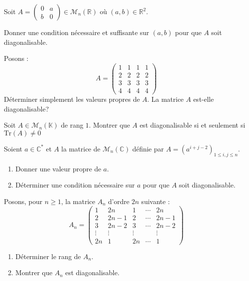 \documentclass[a4paper,10pt]{report}
\begin{document}
\begin{Exa} Soit $A= \begin{pmatrix}
0 & a \\
b & 0
\end{pmatrix} \in \mathcal{M}_n(\mathbb{R})$ où $(a,b) \in \mathbb{R}^2$. 

Donner une condition nécessaire et suffisante sur $(a,b)$ pour que $A$ soit diagonalisable.
\end{Exa}


\begin{Exa} Posons :
    \[
    A =
    \begin{pmatrix}
      1 & 1 & 1 & 1 \\
      2 & 2 & 2 & 2 \\
      3 & 3 & 3 & 3 \\
      4 & 4 & 4 & 4
    \end{pmatrix}
    \]
Déterminer simplement les valeurs propres de $A$. La matrice $A$ est-elle diagonalisable?
\end{Exa}



\begin{Exa}\label{Rang} Soit $A \in \mathcal{M}_{n}(\mathbb{K})$ de rang $1$. Montrer que $A$ est diagonalisable si et seulement si $\textrm{Tr}(A) \neq 0$ \end{Exa}


\begin{Exa} Soient $a \in \mathbb{C}^*$ et $A$ la matrice de $\mathcal{M}_n(\mathbb{C})$ définie par $A=( a^{i+j-2})_{1 \leq i,j \leq n}$.

\begin{enumerate}
\item Donner une valeur propre de $a$.
\item Déterminer une condition nécessaire sur $a$ pour que $A$ soit diagonalisable.
\end{enumerate}
\end{Exa}



\begin{Exa}[\ding{80}] Posons, pour $n \geq 1$, la matrice $A_n$ d'ordre $2n$ suivante :
$$ A_n = \begin{pmatrix}
1 & 2n & 1 & \cdots & 2n \\
2 & 2n-1 & 2 & \cdots & 2n-1 \\
3 & 2n-2 & 3 & \cdots & 2n-2 \\
\vdots & \vdots & \vdots &  & \vdots \\
2n & 1 & 2n & \cdots & 1
\end{pmatrix}$$

\begin{enumerate}
\item Déterminer le rang de $A_n$.
\item Montrer que $A_n$ est diagonalisable.
\end{enumerate}
\end{Exa}
\end{document}
